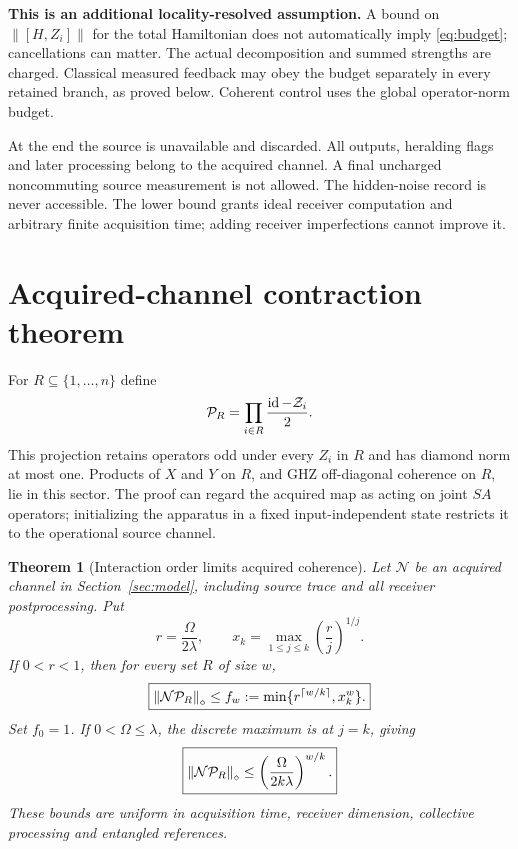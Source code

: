 \documentclass[11pt,a4paper]{article}
\newtheorem{theorem}{Theorem}\newtheorem{corollary}[theorem]{Corollary}
\newcommand{\id}{\operatorname{id}}\newcommand{\Tr}{\operatorname{Tr}}\newcommand{\Ad}{\operatorname{Ad}}
\newcommand{\norm}[1]{\left\lVert #1\right\rVert}
\newcommand{\calN}{\mathcal N}\newcommand{\calU}{\mathcal U}\newcommand{\calV}{\mathcal V}
\begin{document}
\textbf{This is an additional locality-resolved assumption.} A bound on $\norm{[H,Z_i]}$ for the total Hamiltonian does not automatically imply \eqref{eq:budget}; cancellations can matter. The actual decomposition and summed strengths are charged. Classical measured feedback may obey the budget separately in every retained branch, as proved below. Coherent control uses the global operator-norm budget.

At the end the source is unavailable and discarded. All outputs, heralding flags and later processing belong to the acquired channel. A final uncharged noncommuting source measurement is not allowed. The hidden-noise record is never accessible. The lower bound grants ideal receiver computation and arbitrary finite acquisition time; adding receiver imperfections cannot improve it.

\section{Acquired-channel contraction theorem}

For $R\subseteq\{1,\ldots,n\}$ define
\begin{equation}
\calP_R=\prod_{i\in R}\frac{\id-\calZ_i}{2}.
\end{equation}
This projection retains operators odd under every $Z_i$ in $R$ and has diamond norm at most one. Products of $X$ and $Y$ on $R$, and GHZ off-diagonal coherence on $R$, lie in this sector. The proof can regard the acquired map as acting on joint $SA$ operators; initializing the apparatus in a fixed input-independent state restricts it to the operational source channel.

\begin{theorem}[Interaction order limits acquired coherence]
\label{thm:main}
Let $\calN$ be an acquired channel in Section~\ref{sec:model}, including source trace and all receiver postprocessing. Put
\begin{equation}
r=\frac{\Omega}{2\lambda},\qquad x_k=\max_{1\le j\le k}\left(\frac rj\right)^{1/j}.
\end{equation}
If $0<r<1$, then for every set $R$ of size $w$,
\begin{equation}
\boxed{\norm{\calN\calP_R}_\diamond\le f_w:=\min\{r^{\lceil w/k\rceil},x_k^w\}.}
\label{eq:main}
\end{equation}
Set $f_0=1$. If $0<\Omega\le\lambda$, the discrete maximum is at $j=k$, giving
\begin{equation}
\boxed{\norm{\calN\calP_R}_\diamond\le\left(\frac{\Omega}{2k\lambda}\right)^{w/k}.}
\label{eq:simple}
\end{equation}
These bounds are uniform in acquisition time, receiver dimension, collective processing and entangled references.
\end{theorem}
\end{document}
